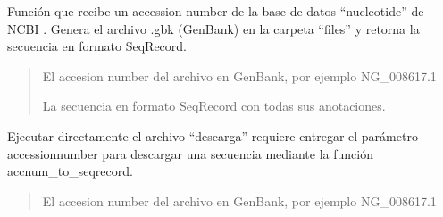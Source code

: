 \documentclass[letterpaper,10pt,spanish]{sphinxmanual}
\begin{document}
\label{\detokenize{descarga:module-descarga}}

\begin{fulllineitems}
\label{\detokenize{descarga:descarga.accnum_to_seqrecord}}
\pysigstartsignatures
{}
\pysigstopsignatures
\sphinxAtStartPar
Función que recibe un accession number de la base de datos “nucleotide” de NCBI
.
Genera el archivo .gbk (GenBank) en la carpeta “files” y retorna la secuencia en formato SeqRecord.
\begin{quote}\begin{description}
\sphinxAtStartPar
{} \textendash{} El accesion number del archivo en GenBank, por ejemplo NG\_008617.1

\sphinxAtStartPar
La secuencia en formato SeqRecord con todas sus anotaciones.

\end{description}\end{quote}

\end{fulllineitems}


\begin{fulllineitems}
\label{\detokenize{descarga:descarga.main}}
\pysigstartsignatures
{}
\pysigstopsignatures
\sphinxAtStartPar
Ejecutar directamente el archivo “descarga” requiere entregar el parámetro \textendash{}accessionnumber para
descargar una secuencia mediante la función accnum\_to\_seqrecord.
\begin{quote}\begin{description}
\sphinxAtStartPar
{} \textendash{} El accesion number del archivo en GenBank, por ejemplo NG\_008617.1

\end{description}\end{quote}

\end{fulllineitems}
\end{document}

